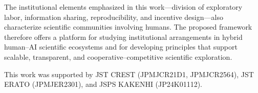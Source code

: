 \documentclass[sigconf]{aamas}
\begin{document}
The institutional elements emphasized in this work—division of exploratory labor, information sharing, reproducibility, and incentive design—also characterize scientific communities involving humans. The proposed framework therefore offers a platform for studying institutional arrangements in hybrid human--AI scientific ecosystems and for developing principles that support scalable, transparent, and cooperative–competitive scientific exploration.

\begin{acks}
This work was supported by JST CREST (JPMJCR21D1, JPMJCR2564), JST ERATO (JPMJER2301), and JSPS KAKENHI (JP24K01112).
\end{acks}


\balance
 


\end{document}
